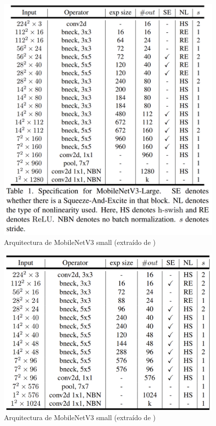 \begin{figure}[H]
	\label{fig:mbnetlarge}
	\centering
	\includegraphics[scale = 0.25]{imagenes/mbnetv3-large.png}
	\caption{Arquitectura de MobileNetV3 small (extraído de \cite{howard2019searching})}
\end{figure}


\begin{figure}[H]
	\label{fig:mbnetsmall}
	\centering
	\includegraphics[scale = 0.25]{imagenes/mbnetv3-small.png}
	\caption{Arquitectura de MobileNetV3 small (extraído de \cite{howard2019searching})}
\end{figure}

